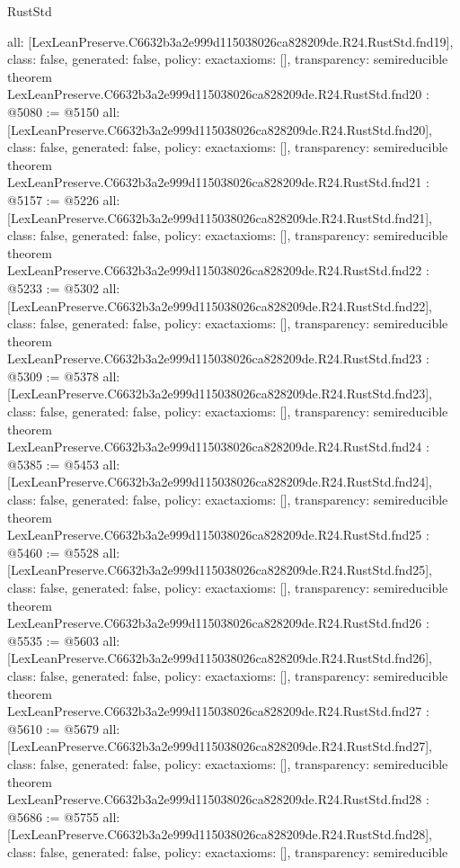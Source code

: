 \begin{lexlean}{RustStd}
\begin{coremodule}
{  all: [LexLeanPreserve.C6632b3a2e999d115038026ca828209de.R24.RustStd.fnd19],
  class: false,
  generated: false,
  policy: exact{axioms: []},
  transparency: semireducible
}
theorem LexLeanPreserve.C6632b3a2e999d115038026ca828209de.R24.RustStd.fnd20 : @5080 := @5150 {
  all: [LexLeanPreserve.C6632b3a2e999d115038026ca828209de.R24.RustStd.fnd20],
  class: false,
  generated: false,
  policy: exact{axioms: []},
  transparency: semireducible
}
theorem LexLeanPreserve.C6632b3a2e999d115038026ca828209de.R24.RustStd.fnd21 : @5157 := @5226 {
  all: [LexLeanPreserve.C6632b3a2e999d115038026ca828209de.R24.RustStd.fnd21],
  class: false,
  generated: false,
  policy: exact{axioms: []},
  transparency: semireducible
}
theorem LexLeanPreserve.C6632b3a2e999d115038026ca828209de.R24.RustStd.fnd22 : @5233 := @5302 {
  all: [LexLeanPreserve.C6632b3a2e999d115038026ca828209de.R24.RustStd.fnd22],
  class: false,
  generated: false,
  policy: exact{axioms: []},
  transparency: semireducible
}
theorem LexLeanPreserve.C6632b3a2e999d115038026ca828209de.R24.RustStd.fnd23 : @5309 := @5378 {
  all: [LexLeanPreserve.C6632b3a2e999d115038026ca828209de.R24.RustStd.fnd23],
  class: false,
  generated: false,
  policy: exact{axioms: []},
  transparency: semireducible
}
theorem LexLeanPreserve.C6632b3a2e999d115038026ca828209de.R24.RustStd.fnd24 : @5385 := @5453 {
  all: [LexLeanPreserve.C6632b3a2e999d115038026ca828209de.R24.RustStd.fnd24],
  class: false,
  generated: false,
  policy: exact{axioms: []},
  transparency: semireducible
}
theorem LexLeanPreserve.C6632b3a2e999d115038026ca828209de.R24.RustStd.fnd25 : @5460 := @5528 {
  all: [LexLeanPreserve.C6632b3a2e999d115038026ca828209de.R24.RustStd.fnd25],
  class: false,
  generated: false,
  policy: exact{axioms: []},
  transparency: semireducible
}
theorem LexLeanPreserve.C6632b3a2e999d115038026ca828209de.R24.RustStd.fnd26 : @5535 := @5603 {
  all: [LexLeanPreserve.C6632b3a2e999d115038026ca828209de.R24.RustStd.fnd26],
  class: false,
  generated: false,
  policy: exact{axioms: []},
  transparency: semireducible
}
theorem LexLeanPreserve.C6632b3a2e999d115038026ca828209de.R24.RustStd.fnd27 : @5610 := @5679 {
  all: [LexLeanPreserve.C6632b3a2e999d115038026ca828209de.R24.RustStd.fnd27],
  class: false,
  generated: false,
  policy: exact{axioms: []},
  transparency: semireducible
}
theorem LexLeanPreserve.C6632b3a2e999d115038026ca828209de.R24.RustStd.fnd28 : @5686 := @5755 {
  all: [LexLeanPreserve.C6632b3a2e999d115038026ca828209de.R24.RustStd.fnd28],
  class: false,
  generated: false,
  policy: exact{axioms: []},
  transparency: semireducible
}
\end{coremodule}
\end{lexlean}
